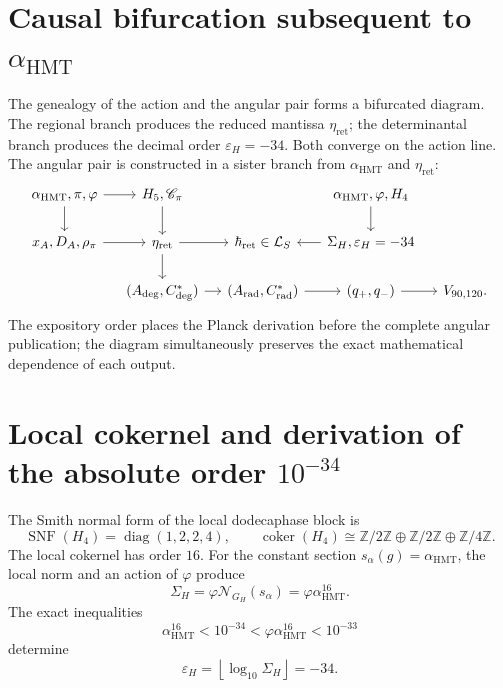 \section{Causal bifurcation subsequent to \texorpdfstring{\(\alpha_{\mathrm{HMT}}\)}{alpha HMT}}
\label{sec:l9s102:bifurcacion-accion-angular}

The genealogy of the action and the angular pair forms a bifurcated diagram.
The regional branch produces the reduced mantissa \(\eta_{\mathrm{ret}}\); the
determinantal branch produces the decimal order \(\varepsilon_H=-34\). Both
converge on the action line. The angular pair is constructed in a sister
branch from \(\alpha_{\mathrm{HMT}}\) and
\(\eta_{\mathrm{ret}}\):
\begin{equation}
\begin{tikzcd}[column sep=small,row sep=normal]
\alpha_{\mathrm{HMT}},\pi,\varphi
  \arrow[r] \arrow[d]
& H_5,\mathscr C_\pi
  \arrow[d]
&& \alpha_{\mathrm{HMT}},\varphi,H_4
  \arrow[d] & {}\\
x_A,D_A,\rho_\pi
  \arrow[r]
& \eta_{\mathrm{ret}}
  \arrow[r] \arrow[d]
& \hbar_{\mathrm{ret}}\in\mathcal L_S
& \Sigma_H,\varepsilon_H=-34
  \arrow[l] & {}\\
& (A_{\deg},C^*_{\deg})
  \arrow[r]
& (A_{\mathrm{rad}},C^*_{\mathrm{rad}})
  \arrow[r]
& (q_+,q_-)
  \arrow[r]
& V_{90,120}.
\end{tikzcd}
\label{diag:l9s102:dag-accion-angular}
\end{equation}
The expository order places the Planck derivation before the complete
angular publication; the diagram simultaneously preserves the exact
mathematical dependence of each output.

\section{Local cokernel and derivation of the absolute order \texorpdfstring{\(10^{-34}\)}{10^-34}}
\label{sec:l9s102:orden-accion}

The Smith normal form of the local dodecaphase block is
\begin{equation}
 \operatorname{SNF}(H_4)=\operatorname{diag}(1,2,2,4),
 \qquad
 \operatorname{coker}(H_4)
 \cong\mathbb Z/2\mathbb Z\oplus\mathbb Z/2\mathbb Z
 \oplus\mathbb Z/4\mathbb Z.
 \label{eq:l9s102:snf-h4}
\end{equation}
The local cokernel has order \(16\). For the constant section
\(s_\alpha(g)=\alpha_{\mathrm{HMT}}\), the local norm and an action of
\(\varphi\) produce
\begin{equation}
 \boxed{
 \Sigma_H=\varphi\mathcal N_{G_H}(s_\alpha)
 =\varphi\alpha_{\mathrm{HMT}}^{16}.}
 \label{eq:l9s102:sigma-h}
\end{equation}
The exact inequalities
\begin{equation}
 \alpha_{\mathrm{HMT}}^{16}<10^{-34}
 <\varphi\alpha_{\mathrm{HMT}}^{16}<10^{-33}
 \label{eq:l9s102:orden-34}
\end{equation}
determine
\begin{equation}
 \boxed{
 \varepsilon_H=\left\lfloor\log_{10}\Sigma_H\right\rfloor=-34.}
 \label{eq:l9s102:epsilon-h}
\end{equation}
